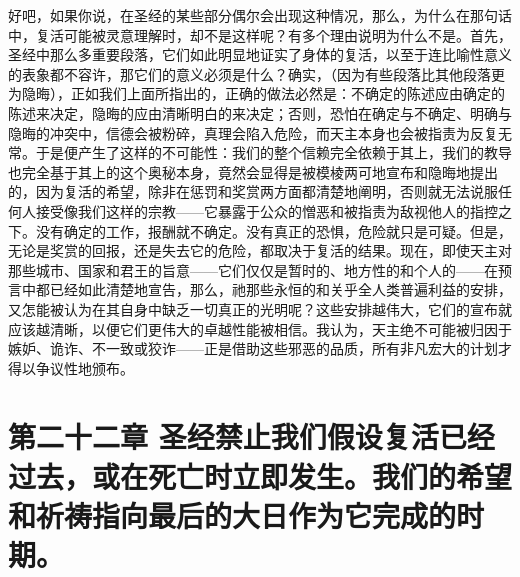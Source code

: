 好吧，如果你说，在圣经的某些部分偶尔会出现这种情况，那么，为什么在那句话中，复活可能被灵意理解时，却不是这样呢？有多个理由说明为什么不是。首先，圣经中那么多重要段落，它们如此明显地证实了身体的复活，以至于连比喻性意义的表象都不容许，那它们的意义必须是什么？确实，（因为有些段落比其他段落更为隐晦），正如我们上面所指出的，正确的做法必然是：不确定的陈述应由确定的陈述来决定，隐晦的应由清晰明白的来决定；否则，恐怕在确定与不确定、明确与隐晦的冲突中，信德会被粉碎，真理会陷入危险，而天主本身也会被指责为反复无常。于是便产生了这样的不可能性：我们的整个信赖完全依赖于其上，我们的教导也完全基于其上的这个奥秘本身，竟然会显得是被模棱两可地宣布和隐晦地提出的，因为复活的希望，除非在惩罚和奖赏两方面都清楚地阐明，否则就无法说服任何人接受像我们这样的宗教——它暴露于公众的憎恶和被指责为敌视他人的指控之下。没有确定的工作，报酬就不确定。没有真正的恐惧，危险就只是可疑。但是，无论是奖赏的回报，还是失去它的危险，都取决于复活的结果。现在，即使天主对那些城市、国家和君王的旨意——它们仅仅是暂时的、地方性的和个人的——在预言中都已经如此清楚地宣告，那么，祂那些永恒的和关乎全人类普遍利益的安排，又怎能被认为在其自身中缺乏一切真正的光明呢？这些安排越伟大，它们的宣布就应该越清晰，以便它们更伟大的卓越性能被相信。我认为，天主绝不可能被归因于嫉妒、诡诈、不一致或狡诈——正是借助这些邪恶的品质，所有非凡宏大的计划才得以争议性地颁布。\par


\section{第二十二章 圣经禁止我们假设复活已经过去，或在死亡时立即发生。我们的希望和祈祷指向最后的大日作为它完成的时期。}

